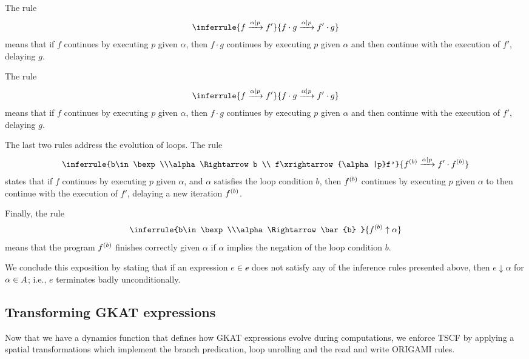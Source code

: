 The rule
\begin{align*}
    \inferrule
    {f\xrightarrow{\alpha|p} f' }
    {f\cdot g\xrightarrow{\alpha|p} f'\cdot g}    
\end{align*}
means that if $f$ continues by executing $p$ given $\alpha$, then $f\cdot g$ continues by executing $p$ given $\alpha$ and then continue with the execution of $f'$, delaying $g$.

The rule 
\begin{align*}
    \inferrule
    {f\xrightarrow{\alpha|p} f' }
    {f\cdot g\xrightarrow{\alpha|p} f'\cdot g}    
\end{align*}
means that if $f$ continues by executing $p$ given $\alpha$, then $f\cdot g$ continues by executing $p$ given $\alpha$ and then continue with the execution of $f'$, delaying $g$.

The last two rules address the evolution of loops. The rule
\begin{align*}
    \inferrule
    {b\in \bexp \\\alpha \Rightarrow b \\ f\xrightarrow{\alpha|p}f'}
    {\iterate{b}{f}\xrightarrow{\alpha|p}f'\cdot \iterate{b}{f}}    
\end{align*}
states that if $f$ continues by executing $p$ given $\alpha$, and $\alpha$ satisfies the loop condition $b$, then $\iterate{b}{f}$ continues by executing $p$ given $\alpha$ to then continue with the execution of $f'$, delaying a new iteration $\iterate{b}{f}$.

Finally, the rule 
\begin{align*}
    \inferrule
    {b\in \bexp \\\alpha \Rightarrow \bar{b} }
    {\iterate{b}{f}\uparrow \alpha}    
\end{align*}
means that the program $\iterate{b}{f}$ finishes correctly given $\alpha$ if $\alpha$ implies the negation of the loop condition $b$. 

We conclude this exposition by stating that if an expression $e\in \mathscr{e}$ does not satisfy any of the inference rules presented above, then $e\downarrow \alpha$ for $\alpha\in \Atom$; i.e., $e$ terminates badly unconditionally. 

\subsection{Transforming GKAT expressions}
Now that we have a dynamics function that defines how GKAT expressions evolve during computations, we enforce TSCF by applying a spatial transformations which implement the branch predication, loop unrolling and the read and write ORIGAMI rules. 

